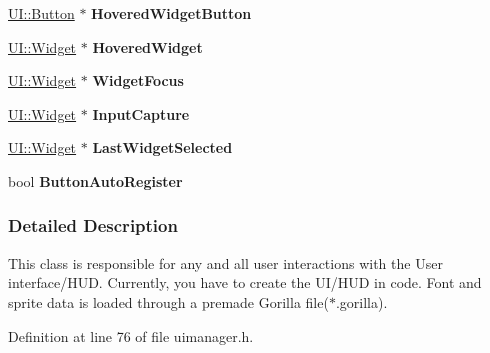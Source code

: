 \begin{DoxyCompactItemize}
\item 
\hypertarget{classphys_1_1UIManager_aed72bede8e73d9d083e6faf352e60c0d}{
\hyperlink{classphys_1_1UI_1_1Button}{UI::Button} $\ast$ {\bfseries HoveredWidgetButton}}
\label{classphys_1_1UIManager_aed72bede8e73d9d083e6faf352e60c0d}

\item 
\hypertarget{classphys_1_1UIManager_a3bcf192e061273695e99a85484c5056a}{
\hyperlink{classphys_1_1UI_1_1Widget}{UI::Widget} $\ast$ {\bfseries HoveredWidget}}
\label{classphys_1_1UIManager_a3bcf192e061273695e99a85484c5056a}

\item 
\hypertarget{classphys_1_1UIManager_a932c928b9246717725c264326660bd6d}{
\hyperlink{classphys_1_1UI_1_1Widget}{UI::Widget} $\ast$ {\bfseries WidgetFocus}}
\label{classphys_1_1UIManager_a932c928b9246717725c264326660bd6d}

\item 
\hypertarget{classphys_1_1UIManager_aefa756d0c982299df8567e92c9de6c46}{
\hyperlink{classphys_1_1UI_1_1Widget}{UI::Widget} $\ast$ {\bfseries InputCapture}}
\label{classphys_1_1UIManager_aefa756d0c982299df8567e92c9de6c46}

\item 
\hypertarget{classphys_1_1UIManager_aac5b0665a4703cf3d10cda216cbb9def}{
\hyperlink{classphys_1_1UI_1_1Widget}{UI::Widget} $\ast$ {\bfseries LastWidgetSelected}}
\label{classphys_1_1UIManager_aac5b0665a4703cf3d10cda216cbb9def}

\item 
\hypertarget{classphys_1_1UIManager_a7c4cec440bfdfe8d1c1b0bf052edd842}{
bool {\bfseries ButtonAutoRegister}}
\label{classphys_1_1UIManager_a7c4cec440bfdfe8d1c1b0bf052edd842}

\end{DoxyCompactItemize}


\subsubsection{Detailed Description}
This class is responsible for any and all user interactions with the User interface/HUD. Currently, you have to create the UI/HUD in code. Font and sprite data is loaded through a premade Gorilla file($\ast$.gorilla). 

Definition at line 76 of file uimanager.h.



